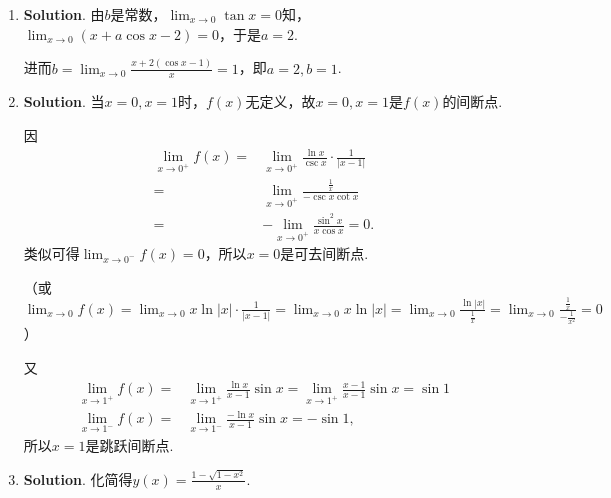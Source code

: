 \documentclass[../main.tex]{subfiles}
\begin{document}
\begin{enumerate}
          因
          \[
              \begin{aligned}
                  \lim_{x\to0}\frac{(x-\arctan x)'}{(cx^r)'}= {} & \frac{1-\frac{1}{1+x^2}}{crx^{r-1}} \\
                  = {}                                           & \lim_{x\to0}\frac{1}{crx^{r-3}},
              \end{aligned}
          \]
          所以$\lim_{x\to0}\frac{1}{crx^{r-3}}=1$，从而$r=3,c=\frac{1}{3}$，即主部为$\frac{1}{3}
              x^{3}$，阶数为$3$.

    \item \textbf{Solution}. 由$b$是常数，$\lim_{x\to0}\tan x=0$知，$\lim_{x\to0}
              (x+a\cos x-2)=0$，于是$a=2$.

          进而$b=\lim_{x\to0}\frac{x+2(\cos x-1)}{x}=1$，即$a=2,b=1$.

    \item \textbf{Solution}. 当$x=0,x=1$时，$f(x)$无定义，故$x=0,x=1$是$f(x)$的间断点.

          因
          \[
              \begin{aligned}
                  \lim_{x\to0^+}f(x)= {} & \lim_{x\to0^+}\frac{\ln x}{\csc x}\cdot\frac{1}{|x-1|} \\
                  = {}                   & \lim_{x\to0^+}\frac{\frac{1}{x}}{-\csc x\cot x}        \\
                  = {}                   & -\lim_{x\to0^+}\frac{\sin ^2 x}{x\cos x}=0.
              \end{aligned}
          \]
          类似可得$\lim_{x\to0^-}f(x)=0$，所以$x=0$是可去间断点.

          （或$\lim_{x\to0}f(x)=\lim_{x\to0}x\ln|x|\cdot\frac{1}{|x-1|}=\lim_{x\to 0}
              x\ln|x|=\lim_{x\to0}\frac{\ln|x|}{\frac{1}{x}}=\lim_{x\to0}\frac{\frac{1}{x}}{-\frac{1}{x^{2}}}
              =0$）

          又
          \[
              \begin{aligned}
                  \lim_{x\to1^+}f(x)= {} & \lim_{x\to1^+}\frac{\ln x}{x-1}\sin x=\lim_{x\to1^+}\frac{x-1}{x-1}\sin x=\sin 1 \\
                  \lim_{x\to1^-}f(x)= {} & \lim_{x\to1^-}\frac{-\ln x}{x-1}\sin x=-\sin 1,
              \end{aligned}
          \]
          所以$x=1$是跳跃间断点.

    \item \textbf{Solution}. 化简得$y(x)=\frac{1-\sqrt{1-x^{2}}}{x}$.


\end{enumerate}
\end{document}
